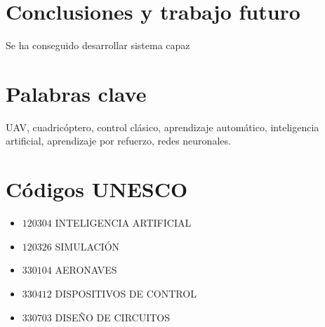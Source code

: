 \section*{Conclusiones y trabajo futuro}

Se ha conseguido desarrollar sistema capaz 
\newpage
\section*{Palabras clave}
UAV, cuadricóptero, control clásico, aprendizaje automático, inteligencia artificial, aprendizaje por refuerzo, redes neuronales.

\section*{Códigos UNESCO}
\begin{itemize}
	\item[] $120304$ \quad INTELIGENCIA ARTIFICIAL
	\item[] $120326$ \quad SIMULACIÓN
	\item[] $330104$ \quad AERONAVES
	\item[] $330412$ \quad DISPOSITIVOS DE CONTROL
	\item[] $330703$ \quad DISEÑO DE CIRCUITOS 

\end{itemize}
\newpage
\cleardoublepage